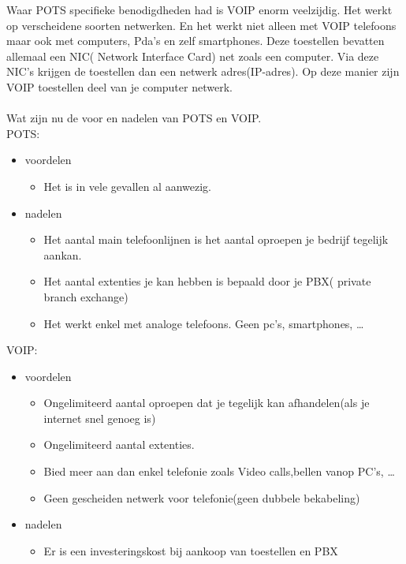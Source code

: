 \documentclass[pdftex,a4paper,12pt,twoside]{report}
\begin{document}
Waar POTS specifieke benodigdheden had is VOIP enorm veelzijdig. Het werkt op verscheidene soorten netwerken. En het werkt niet alleen met VOIP telefoons maar ook met computers, Pda’s en zelf smartphones. Deze toestellen bevatten allemaal een NIC( Network Interface Card) net zoals een computer. Via deze NIC’s krijgen de toestellen dan een netwerk adres(IP-adres). Op deze manier zijn VOIP toestellen deel van je computer netwerk. \\ \\
Wat zijn nu de voor en nadelen van POTS en VOIP.\\

POTS: 
\begin{itemize}
	\item voordelen
	\begin{itemize}
		\item Het is in vele gevallen al aanwezig.
	\end{itemize}
	\item nadelen
	\begin{itemize}
		\item Het aantal main telefoonlijnen is het aantal oproepen je bedrijf tegelijk aankan. 
		\item Het aantal extenties je kan hebben is bepaald door je PBX( private branch exchange)
		\item Het werkt enkel met analoge telefoons. Geen pc's, smartphones, \ldots
	\end{itemize}
\end{itemize} 
VOIP: 
\begin{itemize}
	\item voordelen
	\begin{itemize}
		\item Ongelimiteerd aantal oproepen dat je tegelijk kan afhandelen(als je internet snel genoeg is)
		\item Ongelimiteerd aantal extenties.
		\item Bied meer aan dan enkel telefonie zoals Video calls,bellen vanop PC's, \ldots
		\item Geen gescheiden netwerk voor telefonie(geen dubbele bekabeling)
	\end{itemize}
	\item nadelen
	\begin{itemize}
		\item Er is een investeringskost bij aankoop van toestellen en PBX
	\end{itemize}
\end{itemize} 
\end{document}
